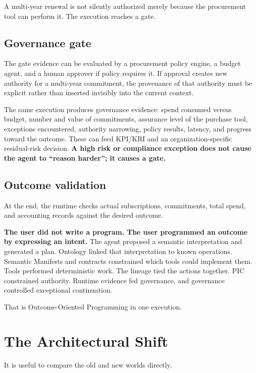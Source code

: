 \documentclass[10pt,oneside,openany]{book}
\begin{document}
A multi-year renewal is not silently authorized merely because the procurement tool can perform it. The execution reaches a gate.

\section{Governance gate}
The gate evidence can be evaluated by a procurement policy engine, a budget agent, and a human approver if policy requires it. If approval creates new authority for a multi-year commitment, the provenance of that authority must be explicit rather than inserted invisibly into the current context.

The same execution produces governance evidence: spend consumed versus budget, number and value of commitments, assurance level of the purchase tool, exceptions encountered, authority narrowing, policy results, latency, and progress toward the outcome. These can feed KPI/KRI and an organization-specific residual-risk decision. \textbf{A high risk or compliance exception does not cause the agent to ``reason harder''; it causes a gate.}

\section{Outcome validation}
At the end, the runtime checks actual subscriptions, commitments, total spend, and accounting records against the desired outcome.

\textbf{The user did not write a program. The user programmed an outcome by expressing an intent.} The agent proposed a semantic interpretation and generated a plan. Ontology linked that interpretation to known operations. Semantic Manifests and contracts constrained which tools could implement them. Tools performed deterministic work. The lineage tied the actions together. PIC constrained authority. Runtime evidence fed governance, and governance controlled exceptional continuation.

That is Outcome-Oriented Programming in one execution.

\chapter{The Architectural Shift}

It is useful to compare the old and new worlds directly.
\end{document}
